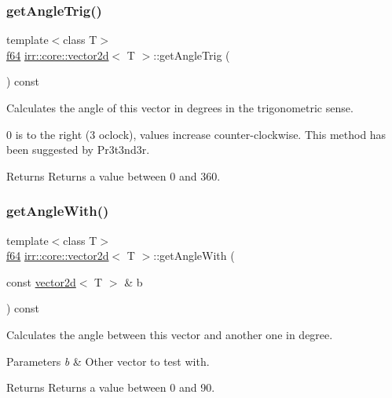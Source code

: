 \subsubsection{\texorpdfstring{get\+Angle\+Trig()}{getAngleTrig()}}
{\footnotesize\ttfamily template$<$class T$>$ \\
\hyperlink{namespaceirr_a1325b02603ad449f92c68fc640af9b28}{f64} \hyperlink{classirr_1_1core_1_1vector2d}{irr\+::core\+::vector2d}$<$ T $>$\+::get\+Angle\+Trig (\begin{DoxyParamCaption}{ }\end{DoxyParamCaption}) const\hspace{0.3cm}{\ttfamily [inline]}}



Calculates the angle of this vector in degrees in the trigonometric sense. 

0 is to the right (3 o\textquotesingle{}clock), values increase counter-\/clockwise. This method has been suggested by Pr3t3nd3r. \begin{DoxyReturn}{Returns}
Returns a value between 0 and 360. 
\end{DoxyReturn}
\mbox{\label{classirr_1_1core_1_1vector2d_a82714b4037cc4985992647ea69974a60}} 
\subsubsection{\texorpdfstring{get\+Angle\+With()}{getAngleWith()}}
{\footnotesize\ttfamily template$<$class T$>$ \\
\hyperlink{namespaceirr_a1325b02603ad449f92c68fc640af9b28}{f64} \hyperlink{classirr_1_1core_1_1vector2d}{irr\+::core\+::vector2d}$<$ T $>$\+::get\+Angle\+With (\begin{DoxyParamCaption}\item[{const \hyperlink{classirr_1_1core_1_1vector2d}{vector2d}$<$ T $>$ \&}]{b }\end{DoxyParamCaption}) const\hspace{0.3cm}{\ttfamily [inline]}}



Calculates the angle between this vector and another one in degree. 


\begin{DoxyParams}{Parameters}
{\em b} & Other vector to test with. \\
\hline
\end{DoxyParams}
\begin{DoxyReturn}{Returns}
Returns a value between 0 and 90. 
\end{DoxyReturn}
\mbox{\label{classirr_1_1core_1_1vector2d_a351a36a3c2fff525fc17ec15c5d0207f}} 
